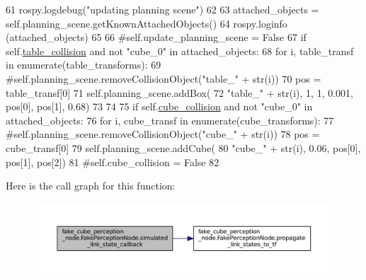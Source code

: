 \begin{DoxyCode}
61             rospy.logdebug(\textcolor{stringliteral}{"updating planning scene"})
62 
63             attached\_objects = self.planning\_scene.getKnownAttachedObjects()
64             rospy.loginfo (attached\_objects)
65 
66             \textcolor{comment}{#self.update\_planning\_scene = False}
67             \textcolor{keywordflow}{if} self.\hyperlink{classfake__cube__perception__node_1_1FakePerceptionNode_a47eafffe4962f50c353a0a2adb9e71be}{table\_collision} \textcolor{keywordflow}{and} \textcolor{keywordflow}{not} \textcolor{stringliteral}{"cube\_0"} \textcolor{keywordflow}{in} attached\_objects:
68                 \textcolor{keywordflow}{for} i, table\_transf \textcolor{keywordflow}{in} enumerate(table\_transforms):
69                     \textcolor{comment}{#self.planning\_scene.removeCollisionObject("table\_" + str(i))}
70                     pos = table\_transf[0]
71                     self.planning\_scene.addBox(
72                         \textcolor{stringliteral}{"table\_"} + str(i), 1, 1, 0.001, pos[0],  pos[1],  0.68)
73             
74             
75             \textcolor{keywordflow}{if} self.\hyperlink{classfake__cube__perception__node_1_1FakePerceptionNode_a5af28c647aa93cf6bb90d4228e27667f}{cube\_collision} \textcolor{keywordflow}{and} \textcolor{keywordflow}{not} \textcolor{stringliteral}{"cube\_0"} \textcolor{keywordflow}{in} attached\_objects:
76                 \textcolor{keywordflow}{for} i, cube\_transf \textcolor{keywordflow}{in} enumerate(cube\_transforms):
77                     \textcolor{comment}{#self.planning\_scene.removeCollisionObject("cube\_" + str(i))}
78                     pos = cube\_transf[0]
79                     self.planning\_scene.addCube(
80                         \textcolor{stringliteral}{"cube\_"} + str(i), 0.06, pos[0],  pos[1],  pos[2])
81                     \textcolor{comment}{#self.cube\_collision = False}
82 
\end{DoxyCode}


Here is the call graph for this function\+:
\nopagebreak
\begin{figure}[H]
\begin{center}
\leavevmode
\includegraphics[width=350pt]{classfake__cube__perception__node_1_1FakePerceptionNode_ac1127eae8d2eda994b22873529bd198f_cgraph}
\end{center}
\end{figure}


